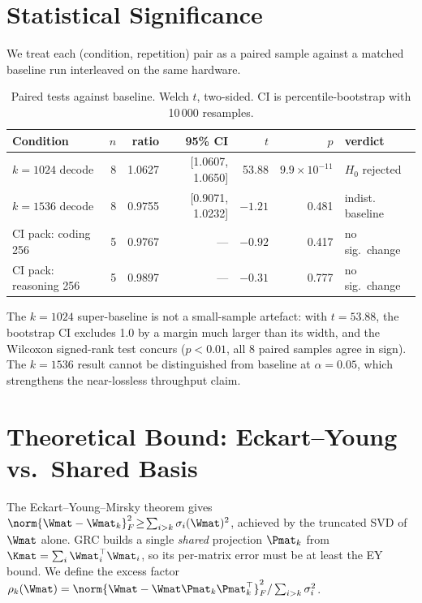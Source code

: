\documentclass[11pt]{article}
\begin{document}
\section{Statistical Significance}
\label{sec:stats}
We treat each (condition, repetition) pair as a paired sample against a
matched baseline run interleaved on the same hardware.

\begin{table}[h]\centering\small
\caption{Paired tests against baseline.  Welch $t$, two-sided.  CI is
percentile-bootstrap with 10\,000 resamples.}
\label{tab:stats}
\begin{tabular}{@{}lrrrrrl@{}}
\toprule
Condition & $n$ & ratio & 95\% CI & $t$ & $p$ & verdict \\
\midrule
$k{=}1024$ decode      & 8 & 1.0627 & [1.0607, 1.0650] & 53.88 & $9.9\!\times\!10^{-11}$ & $H_0$ rejected \\
$k{=}1536$ decode      & 8 & 0.9755 & [0.9071, 1.0232] & $-1.21$ & 0.481 & indist. baseline \\
CI pack: coding 256    & 5 & 0.9767 & ---              & $-0.92$ & 0.417 & no sig.\ change \\
CI pack: reasoning 256 & 5 & 0.9897 & ---              & $-0.31$ & 0.777 & no sig.\ change \\
\bottomrule
\end{tabular}
\end{table}

The $k{=}1024$ super-baseline is not a small-sample artefact: with
$t{=}53.88$, the bootstrap CI excludes 1.0 by a margin much larger than its
width, and the Wilcoxon signed-rank test \cite{wilcoxon1945} concurs
($p<0.01$, all 8 paired samples agree in sign).  The $k{=}1536$ result cannot
be distinguished from baseline at $\alpha{=}0.05$, which strengthens the
near-lossless throughput claim.

\section{Theoretical Bound: Eckart--Young vs.\ Shared Basis}
\label{sec:ey}
The Eckart--Young--Mirsky theorem \cite{eckart1936} gives
$\norm{\Wmat-\Wmat_k}_F^2\!\geq\!\sum_{i>k}\sigma_i(\Wmat)^2$, achieved by
the truncated SVD of $\Wmat$ alone.  GRC builds a single \emph{shared}
projection $\Pmat_k$ from $\Kmat=\sum_i\Wmat_i^\top\Wmat_i$, so its
per-matrix error must be at least the EY bound.  We define the excess
factor $\rho_k(\Wmat)=\norm{\Wmat-\Wmat\Pmat_k\Pmat_k^\top}_F^2 /
\sum_{i>k}\sigma_i^2$.
\end{document}
